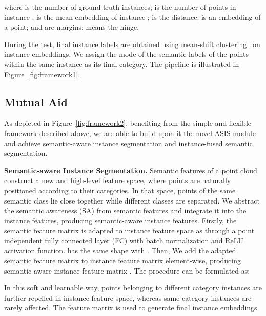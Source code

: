 \documentclass[10pt,twocolumn,letterpaper]{article}
\newcommand{\myparagraph}[1]{{\vspace{0.5em} \noindent \bf #1}}
\begin{document}
where  is the number of ground-truth instances;  is the number of points in instance ;
 is the mean embedding of instance ;
 is the  distance;
 is an embedding of a point;
 and  are margins;
 means the hinge. 


During the test, 
final instance labels are obtained using mean-shift clustering~\cite{comaniciu2002mean} on instance embeddings.
We assign the mode of the semantic labels of the points within the same instance as its final category. The pipeline is illustrated in Figure~\ref{fig:framework1}.

\subsection{Mutual Aid}
As depicted in Figure~\ref{fig:framework2}, benefiting from the simple and flexible framework described above, we are able to build upon it the novel ASIS module and achieve semantic-aware instance segmentation and instance-fused semantic segmentation. 

\myparagraph{Semantic-aware Instance Segmentation.}
Semantic features of a point cloud construct a new and high-level feature space, where points are naturally positioned according to their categories.
In that space, points of the same semantic class lie close together while different classes are separated.
We abstract the semantic awareness (SA) from semantic features and integrate it into the instance features, producing semantic-aware instance features. 
Firstly, the semantic feature matrix  is adapted to instance feature space as  through a point independent fully connected layer (FC) with batch normalization and ReLU activation function.
 has the same shape with .
Then, We add the adapted semantic feature matrix  to instance feature matrix  element-wise, producing semantic-aware instance feature matrix  .
The procedure can be formulated as:

In this soft and learnable way, points belonging to different category instances are further repelled in instance feature space, whereas same category instances are rarely affected.
The feature matrix  is used to generate final instance embeddings. 
\end{document}
